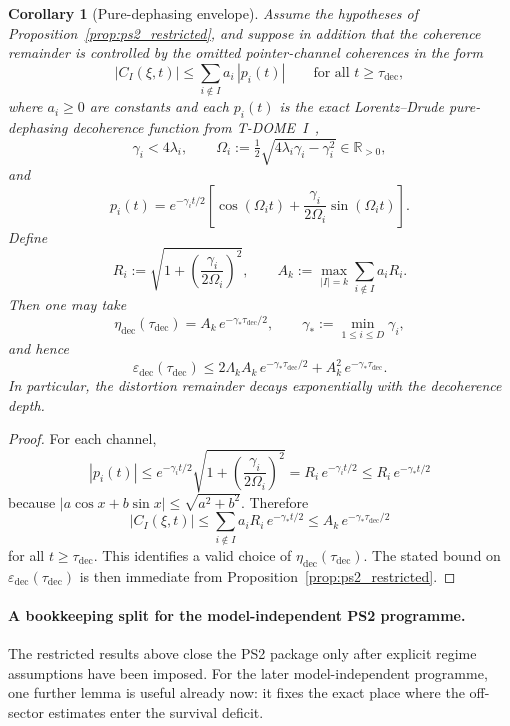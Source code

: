 \documentclass[12pt]{article}
\newtheorem{corollary}[theorem]{Corollary}
\theoremstyle{definition}
\theoremstyle{remark}
\begin{document}
\begin{corollary}[Pure-dephasing envelope]\label{cor:ps2_pure_dephasing}
Assume the hypotheses of Proposition~\ref{prop:ps2_restricted}, and
suppose in addition that the coherence remainder is controlled by the
omitted pointer-channel coherences in the form
\[
|C_I(\xi,t)|
\le
\sum_{i\notin I} a_i\,|p_i(t)|
\qquad
\text{for all } t\ge \tau_{\mathrm{dec}},
\]
where \(a_i\ge 0\) are constants and each \(p_i(t)\) is the exact
Lorentz--Drude pure-dephasing decoherence function from
T-DOME~I~\cite{TDOMEI,BreuerPetruccione2002},
\[
\gamma_i<4\lambda_i,
\qquad
\Omega_i
:=
\tfrac{1}{2}\sqrt{4\lambda_i\gamma_i-\gamma_i^2}
\in \mathbb R_{>0},
\]
and
\[
p_i(t)
=
e^{-\gamma_i t/2}\left[
\cos(\Omega_i t)
+
\frac{\gamma_i}{2\Omega_i}\sin(\Omega_i t)
\right].
\]
Define
\[
R_i
:=
\sqrt{1+\left(\frac{\gamma_i}{2\Omega_i}\right)^2},
\qquad
A_k
:=
\max_{|I|=k}\sum_{i\notin I} a_iR_i.
\]
Then one may take
\[
\eta_{\mathrm{dec}}(\tau_{\mathrm{dec}})
=
A_k\,e^{-\gamma_* \tau_{\mathrm{dec}}/2},
\qquad
\gamma_*
:=
\min_{1\le i\le D}\gamma_i,
\]
and hence
\[
\varepsilon_{\mathrm{dec}}(\tau_{\mathrm{dec}})
\le
2\Lambda_k A_k\,e^{-\gamma_* \tau_{\mathrm{dec}}/2}
+
A_k^2\,e^{-\gamma_* \tau_{\mathrm{dec}}}.
\]
In particular, the distortion remainder decays exponentially with the
decoherence depth.
\end{corollary}

\begin{proof}
For each channel,
\[
|p_i(t)|
\le
e^{-\gamma_i t/2}
\sqrt{1+\left(\frac{\gamma_i}{2\Omega_i}\right)^2}
=
R_i\,e^{-\gamma_i t/2}
\le
R_i\,e^{-\gamma_* t/2}
\]
because \(|a\cos x+b\sin x|\le \sqrt{a^2+b^2}\). Therefore
\[
|C_I(\xi,t)|
\le
\sum_{i\notin I} a_iR_i\,e^{-\gamma_* t/2}
\le
A_k\,e^{-\gamma_* \tau_{\mathrm{dec}}/2}
\]
for all \(t\ge \tau_{\mathrm{dec}}\). This identifies a valid choice of
\(\eta_{\mathrm{dec}}(\tau_{\mathrm{dec}})\). The stated bound on
\(\varepsilon_{\mathrm{dec}}(\tau_{\mathrm{dec}})\) is then immediate
from Proposition~\ref{prop:ps2_restricted}.
\end{proof}

\paragraph{A bookkeeping split for the model-independent PS2 programme.}
The restricted results above close the PS2 package only after explicit
regime assumptions have been imposed. For the later model-independent
programme, one further lemma is useful already now: it fixes the exact
place where the off-sector estimates enter the survival deficit.
\end{document}
